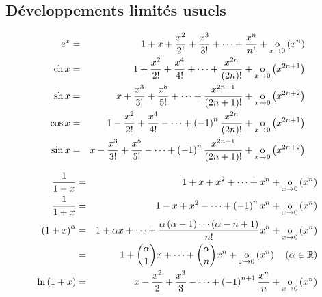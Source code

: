 \documentclass{magnolia}
\begin{document}
\subsection{Développements limités usuels}

\begin{proposition}[utile=-3]
\begin{eqnarray*}
{\rm e}^x &=& 1+x+\frac{x^2}{2!}+\frac{x^3}{3!}+\cdots+\frac{x^n}{n!}
        +\underset{x \rightarrow 0}{\text{o}}\left(x^n\right)\\
\operatorname{ch} x &=& 1+\frac{x^2}{2!}+\frac{x^4}{4!}+\cdots+\frac{x^{2n}}{\left(2n\right)!}
        +\underset{x \rightarrow 0}{\text{o}}\left(x^{2n+1}\right)\\
\operatorname{sh} x &=& x+\frac{x^3}{3!}+\frac{x^5}{5!}+\cdots+\frac{x^{2n+1}}{\left(2n+1\right)!}
        +\underset{x \rightarrow 0}{\text{o}}\left(x^{2n+2}\right)\\
\cos x &=& 1-\frac{x^2}{2!}+\frac{x^4}{4!}-\cdots+\left(-1\right)^n\frac{x^{2n}}{\left(2n\right)!}
        +\underset{x \rightarrow 0}{\text{o}}\left(x^{2n+1}\right)\\
\sin x &=& x-\frac{x^3}{3!}+\frac{x^5}{5!}-\cdots+
        \left(-1\right)^n\frac{x^{2n+1}}{\left(2n+1\right)!}+\underset{x \rightarrow 0}{\text{o}}\left(x^{2n+2}\right)
\end{eqnarray*}
\end{proposition}

\begin{proposition}[utile=-3]
\begin{eqnarray*}
\frac{1}{1-x} &=& 1+x+x^2+\cdots+x^n+\underset{x \rightarrow 0}{\text{o}}\left(x^n\right)\\
\frac{1}{1+x} &=& 1-x+x^2-\cdots+\left(-1\right)^nx^n+\underset{x \rightarrow 0}{\text{o}}\left(x^n\right)\\
\left(1+x\right)^\alpha &=& 1+\alpha x+\cdots+
  \frac{\alpha\left(\alpha-1\right)\cdots\left(\alpha-n+1\right)}{n!}x^n+\underset{x \rightarrow 0}{\text{o}}\left(x^n\right)\\
  &=& 1+\binom{\alpha}{1}x+\cdots+\binom{\alpha}{n}x^n+\underset{x \rightarrow 0}{\text{o}}\left(x^n\right)
    \quad \left(\alpha\in\mathbb{R}\right)\\
\ln\left(1+x\right) &=& x-\frac{x^2}{2}+\frac{x^3}{3}-\cdots+\left(-1\right)^{n+1}\frac{x^n}{n}
  +\underset{x \rightarrow 0}{\text{o}}\left(x^n\right)
\end{eqnarray*}
\end{proposition}

\end{document}
